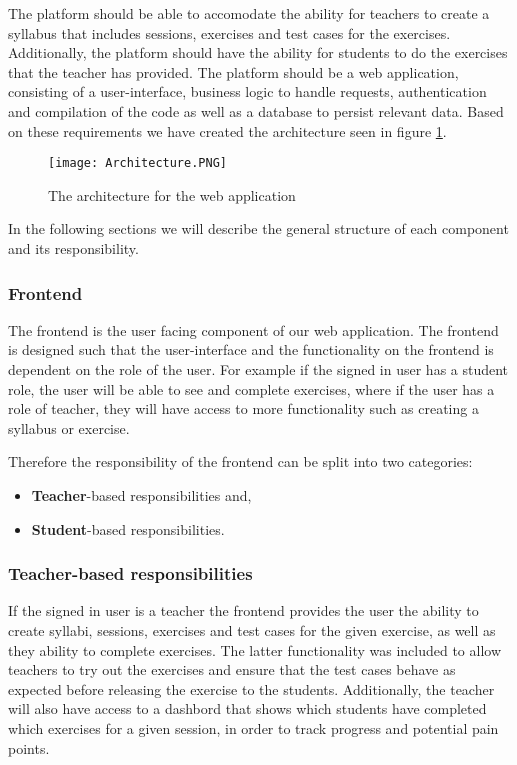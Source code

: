 The platform should be able to accomodate the ability for teachers to create a syllabus that includes sessions, exercises and test cases for the exercises. Additionally, the platform should have the ability for students to do the exercises that the teacher has provided. 
The platform should be a web application, consisting of a user-interface, business logic to handle requests, authentication and compilation of the code as well as a database to persist relevant data.
Based on these requirements we have created the architecture seen in figure \ref{fig:Architecture}.

\begin{figure}[H]
	\texttt{[image: Architecture.PNG]}
	\centering
	\caption{The architecture for the web application}
	\label{fig:Architecture}
\end{figure}

In the following sections we will describe the general structure of each component and its responsibility.

\subsubsection{Frontend}
The frontend is the user facing component of our web application. The frontend is designed such that the user-interface and the functionality on the frontend is dependent on the role of the user. 
For example if the signed in user has a student role, the user will be able to see and complete exercises, where if the user has a role of teacher, they will have access to more functionality such as creating a syllabus or exercise.

Therefore the responsibility of the frontend can be split into two categories: 
\begin{itemize}
    \item \textbf{Teacher}-based responsibilities and,
    \item \textbf{Student}-based responsibilities.
\end{itemize}

\subsubsection*{Teacher-based responsibilities}
If the signed in user is a teacher the frontend provides the user the ability to create syllabi, sessions, exercises and test cases for the given exercise, as well as they ability to complete exercises. The latter functionality was included to allow teachers to try out the exercises and ensure that the test cases behave as expected before releasing the exercise to the students. Additionally, the teacher will also have access to a dashbord that shows which students have completed which exercises for a given session, in order to track progress and potential pain points.

